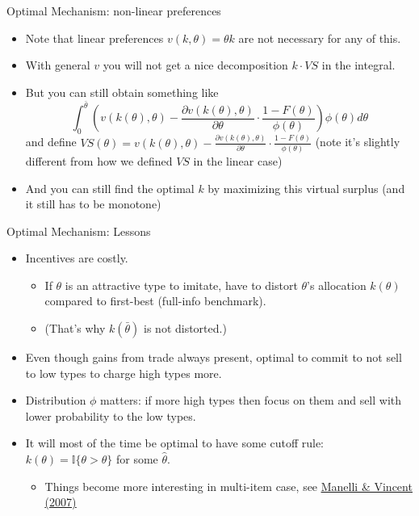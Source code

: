 \documentclass[english,10pt
,aspectratio=169
]{beamer}
\begin{document}
\begin{frame}{Optimal Mechanism: non-linear preferences}
	\begin{itemize}
		\item Note that linear preferences $v(k,\theta) = \theta k$ are not necessary for any of this.
		\item With general $v$ you will not get a nice decomposition $k \cdot VS$ in the integral.
		\item But you can still obtain something like
		\begin{equation*}
			\int_0^{\bar{\theta}} \left( v(k(\theta),\theta) - \frac{\partial v(k(\theta),\theta)}{\partial \theta} \cdot \frac{1-F(\theta)}{\phi(\theta)} \right) \phi(\theta) d\theta
		\end{equation*}
		and define $VS(\theta) = v(k(\theta),\theta) - \frac{\partial v(k(\theta),\theta)}{\partial \theta} \cdot \frac{1-F(\theta)}{\phi(\theta)}$ (note it's slightly different from how we defined $VS$ in the linear case)
		\item And you can still find the optimal $k$ by maximizing this virtual surplus (and it still has to be monotone)
	\end{itemize}
\end{frame}


\begin{frame}{Optimal Mechanism: Lessons}
\begin{itemize}
	\item Incentives are costly.
	\begin{itemize}
		\item If $\theta$ is an attractive type to imitate, have to distort $\theta$'s allocation $k(\theta)$ compared to first-best (full-info benchmark).
		\item (That's why $k(\bar{\theta})$ is not distorted.)
	\end{itemize}
	\item Even though gains from trade always present, optimal to commit to not sell to low types to charge high types more.
	\item Distribution $\phi$ matters: if more high types then focus on them and sell with lower probability to the low types.
	\item It will most of the time be optimal to have some cutoff rule: $k(\theta) = \mathbb{I}\{\theta > \hat{\theta}\}$ for some $\hat{\theta}$.
	\begin{itemize}
		\item Things become more interesting in multi-item case, see \href{https://www.sciencedirect.com/science/article/pii/S0022053107000348}{\uline{Manelli \& Vincent (2007)}}
	\end{itemize}
\end{itemize}
\end{frame}
\end{document}
